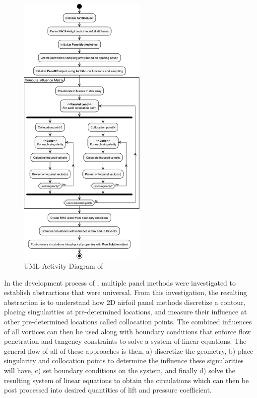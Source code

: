 \begin{figure}
    \centering
    \includegraphics[width=0.55\textwidth]{static/activity_diagram.pdf}
    \caption{UML Activity Diagram of \numfoil}
    \label{fig:activity}
\end{figure}

In the development process of \numfoil, multiple panel methods were
investigated to establish abstractions that were universal. From this
investigation, the resulting abstraction is to understand how 2D airfoil panel
methods discretize a contour, placing singularities at pre-determined
locations, and measure their influence at other pre-determined locations called
collocation points. The combined influences of all vortices can then be used
along with boundary conditions that enforce flow penetration and tangency
constraints to solve a system of linear equations. The general flow of all of
these approaches is then, a) discretize the geometry, b) place singularity and
collocation points to determine the influence these signularities will have, c)
set boundary conditions on the system, and finally d) solve the resulting
system of linear equations to obtain the circulations which can then be post
processed into desired quantities of lift and pressure coefficient.\\

